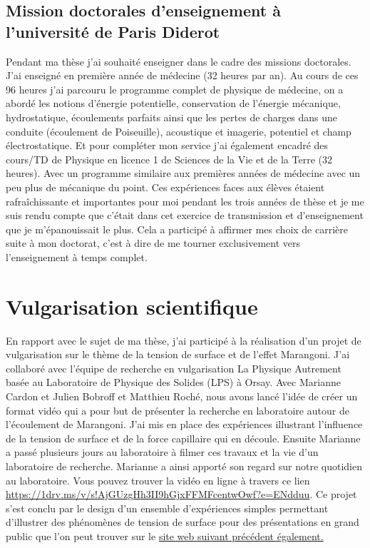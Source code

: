 \documentclass[french, 10pt]{article}
\begin{document}
\subsection{Mission doctorales d'enseignement à l'université de Paris Diderot}

Pendant ma thèse j'ai souhaité enseigner dans le cadre des missions doctorales. J'ai enseigné en première année de médecine (32 heures par an). Au cours de ces 96 heures j'ai parcouru le programme complet de physique de médecine, on a abordé les notions d'énergie potentielle, conservation de l'énergie mécanique, hydrostatique, écoulements parfaits ainsi que les pertes de charges dans une conduite (écoulement de Poiseuille), acoustique et imagerie, potentiel et champ électrostatique. Et pour compléter mon service j'ai également encadré des cours/TD de Physique en licence 1 de Sciences de la Vie et de la Terre (32 heures). Avec un programme similaire aux premières années de médecine avec un peu plus de mécanique du point. Ces expériences faces aux élèves étaient rafraîchissante et importantes pour moi pendant les trois années de thèse et je me suis rendu compte que c'était dans cet exercice de transmission et d'enseignement que je m'épanouissait le plus. Cela a participé à affirmer mes choix de carrière suite à mon doctorat, c'est à dire de me tourner exclusivement vers l'enseignement à temps complet. 

\section{Vulgarisation scientifique}

En rapport avec le sujet de ma thèse, j'ai participé à la réalisation d'un projet de vulgarisation sur le thème de la tension de surface et de l'effet Marangoni. J'ai collaboré avec l'équipe de recherche en vulgarisation \og La Physique Autrement \fg basée au Laboratoire de Physique des Solides (LPS) à Orsay. Avec Marianne Cardon et Julien Bobroff et Matthieu Roché, nous avons lancé l'idée de créer un format vidéo qui a pour but de présenter la recherche en laboratoire autour de l'écoulement de Marangoni. J'ai mis en place des expériences illustrant l'influence de la tension de surface et de la force capillaire qui en découle. Ensuite Marianne a passé plusieurs jours au laboratoire à filmer ces travaux et la vie d'un laboratoire de recherche. Marianne a ainsi apporté son regard sur notre quotidien au laboratoire. Vous pouvez trouver la vidéo en ligne à travers ce lien \url{https://1drv.ms/v/s!AjGUzgHh3II9hGjxFFMFcentwOwf?e=ENdduu}. Ce projet s'est conclu par le design d'un ensemble d'expériences simples permettant d'illustrer des phénomènes de tension de surface pour des présentations en grand public que l'on peut trouver sur le \href{https://hebergement.universite-paris-saclay.fr/supraconductivite/marangoni/marangoni.html#home}{site web suivant précédent également.} \medskip
\end{document}
